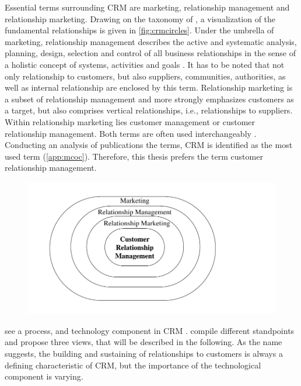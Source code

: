 		Essential terms surrounding CRM are marketing, relationship management and relationship marketing. Drawing on the taxonomy of \citep{hippnerwilde2011}, a visualization of the fundamental relationships is given in \Fig \ref{fig:crmcircles}. Under the umbrella of marketing, relationship management describes the active and systematic analysis, planning, design, selection and control of all business relationships in the sense of a holistic concept of systems, activities and goals \citep[]{diller1995}. It has to be noted that not only relationship to customers, but also suppliers, communities, authorities, as well as internal relationship are enclosed by this term. Relationship marketing is a subset of relationship management and more strongly emphasizes customers as a target, but also comprises vertical relationships, i.e., relationships to suppliers. Within relationship marketing lies customer management or customer relationship management. Both terms are often used interchangeably  \citep{Leuer2011,ryals2001customer}. Conducting an analysis of publications \wrt the terms, \acrshort{CRM} is identified as the most used term (\cf \ref{app:mcoc}). Therefore, this thesis prefers the term customer relationship management.
		
		\begin{figure}[caption={CRM in the field of marketing}, label={fig:crmcirlces}]
			{	\includegraphics[width=.8\textwidth]{figures/crmcircles.pdf}}
		\end{figure}
	
		\citeauthor{Chen_2003} see a process,  and technology component in \acrshort{CRM} \citep{Chen_2003}. \cite{paynefrow2005} compile different standpoints and propose three views, that will be described in the following. As the name suggests, the building and sustaining of relationships to customers is always a defining characteristic of \acrshort{CRM}, but the importance of the technological component is varying. 
		
